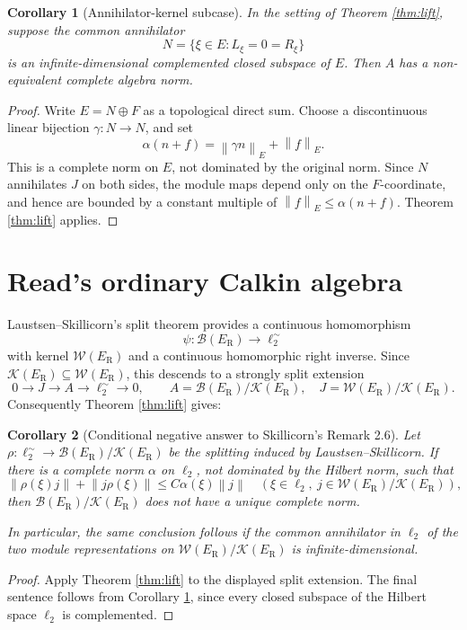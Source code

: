 \documentclass[11pt]{article}
\newtheorem{corollary}{Corollary}
\newcommand{\B}{\mathcal B}
\newcommand{\K}{\mathcal K}
\newcommand{\W}{\mathcal W}
\newcommand{\ER}{E_{\mathrm R}}
\newcommand{\norm}[1]{\left\lVert #1\right\rVert}
\begin{document}
\begin{corollary}[Annihilator-kernel subcase]
\label{cor:annihilator}
In the setting of Theorem \ref{thm:lift}, suppose the common annihilator
\[
  N=\{\xi\in E:L_\xi=0=R_\xi\}
\]
is an infinite-dimensional complemented closed subspace of \(E\).  Then \(A\)
has a non-equivalent complete algebra norm.
\end{corollary}

\begin{proof}
Write \(E=N\oplus F\) as a topological direct sum.  Choose a discontinuous
linear bijection \(\gamma:N\to N\), and set
\[
  \alpha(n+f)=\norm{\gamma n}_E+\norm f_E.
\]
This is a complete norm on \(E\), not dominated by the original norm.  Since
\(N\) annihilates \(J\) on both sides, the module maps depend only on the
\(F\)-coordinate, and hence are bounded by a constant multiple of
\(\norm f_E\leq\alpha(n+f)\).  Theorem \ref{thm:lift} applies.
\end{proof}

\section*{Read's ordinary Calkin algebra}

Laustsen--Skillicorn's split theorem provides a continuous homomorphism
\[
  \psi:\B(\ER)\to \ell_2^\sim
\]
with kernel \(\W(\ER)\) and a continuous homomorphic right inverse.  Since
\(\K(\ER)\subseteq \W(\ER)\), this descends to a strongly split extension
\[
0\to J\to A\to\ell_2^\sim\to0,\qquad
 A=\B(\ER)/\K(\ER),\quad J=\W(\ER)/\K(\ER).
\]
Consequently Theorem \ref{thm:lift} gives:

\begin{corollary}[Conditional negative answer to Skillicorn's Remark 2.6]
\label{cor:read}
Let \(\rho:\ell_2^\sim\to \B(\ER)/\K(\ER)\) be the splitting induced by
Laustsen--Skillicorn.  If there is a complete norm \(\alpha\) on \(\ell_2\),
not dominated by the Hilbert norm, such that
\[
 \norm{\rho(\xi)j}+\norm{j\rho(\xi)}
 \leq C\alpha(\xi)\norm j
 \quad(\xi\in\ell_2,\ j\in \W(\ER)/\K(\ER)),
\]
then \(\B(\ER)/\K(\ER)\) does not have a unique complete norm.

In particular, the same conclusion follows if the common annihilator in
\(\ell_2\) of the two module representations on \(\W(\ER)/\K(\ER)\) is
infinite-dimensional.
\end{corollary}

\begin{proof}
Apply Theorem \ref{thm:lift} to the displayed split extension.  The final
sentence follows from Corollary \ref{cor:annihilator}, since every closed
subspace of the Hilbert space \(\ell_2\) is complemented.
\end{proof}
\end{document}
